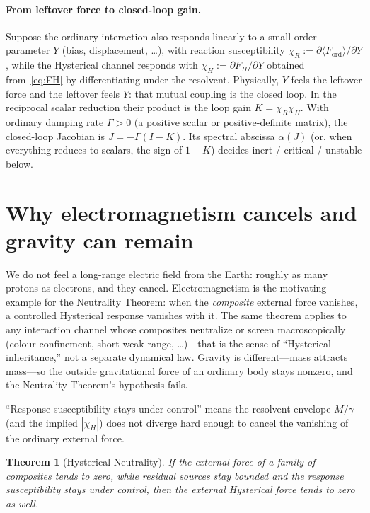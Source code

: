 \documentclass[11pt]{article}
\newtheorem{theorem}{Theorem}[section]
\theoremstyle{remark}
\newcommand{\Gm}{\Gamma}
\newcommand{\chiR}{\chi_{R}}
\newcommand{\chiH}{\chi_{H}}
\begin{document}
\paragraph{From leftover force to closed-loop gain.}
Suppose the ordinary interaction also responds linearly to a small order parameter $Y$ (bias, displacement, \ldots), with reaction susceptibility $\chiR:=\partial\langle F_{\mathrm{ord}}\rangle/\partial Y$, while the Hysterical channel responds with $\chiH:=\partial F_H/\partial Y$ obtained from~\eqref{eq:FH} by differentiating under the resolvent.
Physically, $Y$ feels the leftover force and the leftover feels $Y$: that mutual coupling is the closed loop.
In the reciprocal scalar reduction their product is the loop gain $K=\chiR\chiH$.
With ordinary damping rate $\Gm>0$ (a positive scalar or positive-definite matrix), the closed-loop Jacobian is $J=-\Gm(I-K)$.
Its spectral abscissa $\alpha(J)$ (or, when everything reduces to scalars, the sign of $1-K$) decides inert / critical / unstable below.

\section{Why electromagnetism cancels and gravity can remain}
We do not feel a long-range electric field from the Earth: roughly as many protons as electrons, and they cancel.
Electromagnetism is the motivating example for the Neutrality Theorem: when the \emph{composite} external force vanishes, a controlled Hysterical response vanishes with it.
The same theorem applies to any interaction channel whose composites neutralize or screen macroscopically (colour confinement, short weak range, \ldots)---that is the sense of ``Hysterical inheritance,'' not a separate dynamical law.
Gravity is different---mass attracts mass---so the outside gravitational force of an ordinary body stays nonzero, and the Neutrality Theorem's hypothesis fails.

``Response susceptibility stays under control'' means the resolvent envelope $M/\gamma$ (and the implied $|\chiH|$) does not diverge hard enough to cancel the vanishing of the ordinary external force.

\begin{theorem}[Hysterical Neutrality]
If the external force of a family of composites tends to zero, while residual sources stay bounded and the response susceptibility stays under control, then the external Hysterical force tends to zero as well.
\end{theorem}
\end{document}
